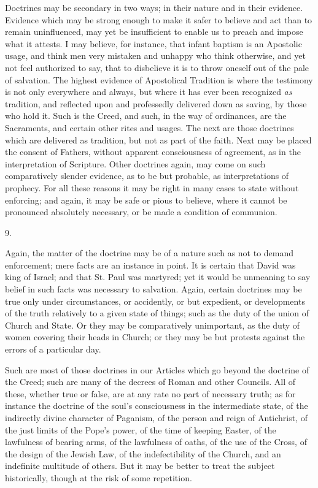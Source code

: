 Doctrines may be secondary in two ways; in their nature and in
their evidence. Evidence which may be strong enough to make it safer
to believe and act than to remain uninfluenced, may yet be
insufficient to enable us to preach and impose what it attests. I may
believe, for instance, that infant baptism is an Apostolic usage, and
think men very mistaken and unhappy who think otherwise, and yet not
feel authorized to say, that to disbelieve it is to throw oneself out
of the pale of salvation. The highest evidence of Apostolical
Tradition is where the testimony is not only everywhere and always,
but where it has ever been recognized \emph{as} tradition, and
reflected upon and professedly delivered down as saving, by those who
hold it. Such is the Creed, and such, in the way of ordinances, are the Sacraments, and certain other rites and usages. The next are
those doctrines which are delivered as tradition, but not as part of
the faith. Next may be placed the consent of Fathers, without apparent
consciousness of agreement, as in the interpretation of Scripture.
Other doctrines again, may come on such comparatively slender
evidence, as to be but probable, as interpretations of prophecy. For
all these reasons it may be right in many cases to state without
enforcing; and again, it may be safe or pious to believe, where it
cannot be pronounced absolutely necessary, or be made a condition of
communion.

9.

Again, the matter of the doctrine may be of a nature such as not to
demand enforcement; mere facts are an instance in point. It is certain
that David was king of Israel; and that St. Paul was martyred; yet it
would be unmeaning to say belief in such facts was necessary to
salvation. Again, certain doctrines may be true only under
circumstances, or accidently, or but expedient, or developments of the
truth relatively to a given state of things; such as the duty of the
union of Church and State. Or they may be comparatively unimportant,
as the duty of women covering their heads in Church; or they may be
but protests against the errors of a particular day.

Such are most of those doctrines in our Articles which go beyond
the doctrine of the Creed; such are many of the decrees of Roman and
other Councils. All of these, whether true or false, are at any rate
no part of necessary truth; as for instance the doctrine of the soul's
consciousness in the intermediate state, of the indirectly divine
character of Paganism, of the person and reign of Antichrist, of the
just limits of the Pope's power, of the time of keeping Easter, of the
lawfulness of bearing arms, of the lawfulness of oaths, of the
use of the Cross, of the design of the Jewish Law, of the
indefectibility of the Church, and an indefinite multitude of others.
But it may be better to treat the subject historically, though at the
risk of some repetition.

